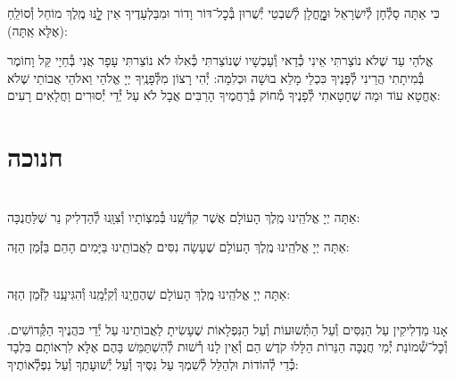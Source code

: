\documentclass[twoside, openany, parskip=half, 11pt]{book}
\begin{document}
כִּי אַתָּה סָלְ֯חָן לְ֯יִשְׂרָאֵל וּמׇׇׇׇׇחֳלָן לְ֯שִׁבְטֵי יְ֯שֻׁרוּן בְּ֯כׇל־דּוֹר וָדוֹר
וּמִבַּלְעָדֶיךָ אֵין לׇׇׇֽנּוּ מֶֽלֶךְ מוֹחֵל וְ֯סוֹלֵֽחַ (אֶלָּא אַֽתָּה):

אֱלֹהַי עַד שֶׁלֹא נוֹצַרתִּי אֵינִי כְּ֯דַאי וְ֯עַכְשָׁיו שֶׁנוֹצַרתִּי כְּ֯אִלוּ לֹא נוֹצַרתִּי עָפָר אֲנִי בְּ֯חַיָי קַּל וָחוֹמֶר בְּ֯מִיתָתִי הֲרֵינִי לְ֯פָּנֶיךָ כִּכְלֵי מָלֵא בוּשָׁה וּכְלִמָה: יְ֯הִי רָצוֹן מִלְּ֯פָנֶֽיךָ יְיָ אֱלֹהַי וֵאלֹהֵי אֲבוֹתַי שֶׁלֹא אֶחֱטָא עוֹד וּמַה שֶׁחָטָאתִי לְ֯פָנֶיךָ מְ֯חוֹק בְּ֯רַחֲמֶיךָ הָרַבִּים אֲבָל לֹא עַל יְ֯דֵי יְ֯סוּרִים וַחֲלָאִים רָעִים:

\vfill
\sepline

\chapter[חנוכה]{ חנוכה }
\label{chanukah}

\\
אַתָּה יְיָ אֱלֹהֵֽינוּ מֶֽלֶךְ הָעוֹלָם
אֲשֶׁר קִדְּ֯שָֽׁנוּ בְּ֯מִצְוֹתָיו וְ֯צִוָּֽנוּ לְ֯הַדְלִיק נֵר שֶׁלַּחֲנֻכָּה:

אַתָּה יְיָ אֱלֹהֵֽינוּ מֶֽלֶךְ הָעוֹלָם שֶׁעָשָׂה נִסִּים לַאֲבוֹתֵֽינוּ בַּיָּמִים הָהֵם בַּזְּ֯מַן הַזֶּה:

\\
אַתָּה יְיָ אֱלֹהֵֽינוּ מֶֽלֶךְ הָעוֹלָם שֶׁהֶחֱיָֽנוּ וְ֯קִיְּ֯מָֽנוּ וְ֯הִגִּיעָֽנוּ לַזְּ֯מַן הַזֶּה:\\

\\
אָנוּ מַדְלִיקִין
עַל הַנִּסִּים וְ֯עַל הַתְּ֯שׁוּעוֹת
וְ֯עַל הַנִּפְלָאוֹת
שֶׁעָשִׂיתָ לַאֲבוֹתֵינוּ
עַל יְ֯דֵי כּהֲנֶיךָ הַקְּ֯דוֹשִׁים.
וְ֯כׇל־שְׁ֯מוֹנַת יְ֯מֵי חֲנֻכָּה
הַנֵּרוֹת הַלָּלוּ קֹדֶשׁ הֵם
וְ֯אֵין לָנוּ רְ֯שׁוּת לְ֯הִשְׁתַּמֵּשׁ בָּהֶם
אֶלָּא לִרְאוֹתָם בִּלְבָד
כְּ֯דֵי לְ֯הוֹדוֹת וּלְהַלֵּל לְ֯שִׁמְךָ
עַל נִסֶּיךָ וְ֯עַל יְ֯שׁוּעָתֶךָ
וְ֯עַל נִפְלְ֯אוֹתֶיךָ:
\end{document}
